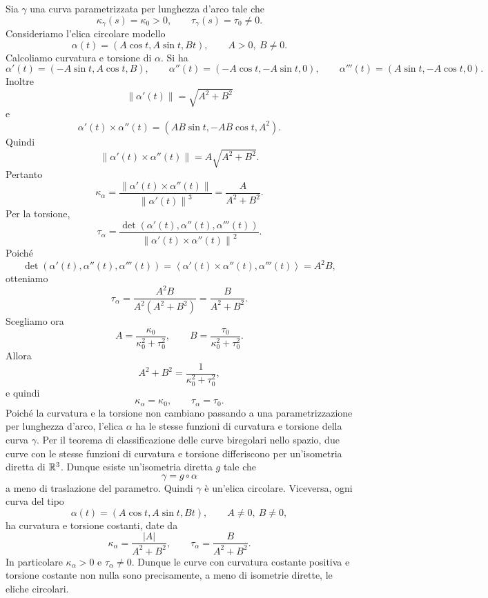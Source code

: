 \documentclass[a4paper]{article}
\begin{document}
\begin{snippetproof}{}
    Sia \(\gamma\) una curva parametrizzata per lunghezza d'arco tale che
    \[
        \kappa_\gamma(s)=\kappa_0>0,
        \qquad
        \tau_\gamma(s)=\tau_0\neq0.
    \]
    Consideriamo l'elica circolare modello
    \[
        \alpha(t)=(A\cos t,A\sin t,Bt),
        \qquad A>0,\ B\neq0.
    \]
    Calcoliamo curvatura e torsione di \(\alpha\). Si ha
    \[
        \alpha'(t)=(-A\sin t,A\cos t,B),
        \qquad
        \alpha''(t)=(-A\cos t,-A\sin t,0),
        \qquad
        \alpha'''(t)=(A\sin t,-A\cos t,0).
    \]
    Inoltre
    \[
        \left\|\alpha'(t)\right\|=\sqrt{A^2+B^2}
    \]
    e
    \[
        \alpha'(t)\times\alpha''(t)
        =
        \left(
            AB\sin t,
            -AB\cos t,
            A^2
        \right).
    \]
    Quindi
    \[
        \left\|\alpha'(t)\times\alpha''(t)\right\|
        =
        A\sqrt{A^2+B^2}.
    \]
    Pertanto
    \[
        \kappa_\alpha
        =
        \frac{\left\|\alpha'(t)\times\alpha''(t)\right\|}{\left\|\alpha'(t)\right\|^3}
        =
        \frac{A}{A^2+B^2}.
    \]
    Per la torsione,
    \[
        \tau_\alpha
        =
        \frac{\det(\alpha'(t),\alpha''(t),\alpha'''(t))}{\left\|\alpha'(t)\times\alpha''(t)\right\|^2}.
    \]
    Poiché
    \[
        \det(\alpha'(t),\alpha''(t),\alpha'''(t))
        =
        \left\langle
            \alpha'(t)\times\alpha''(t),
            \alpha'''(t)
        \right\rangle
        =
        A^2B,
    \]
    otteniamo
    \[
        \tau_\alpha
        =
        \frac{A^2B}{A^2(A^2+B^2)}
        =
        \frac{B}{A^2+B^2}.
    \]
    Scegliamo ora
    \[
        A=\frac{\kappa_0}{\kappa_0^2+\tau_0^2},
        \qquad
        B=\frac{\tau_0}{\kappa_0^2+\tau_0^2}.
    \]
    Allora
    \[
        A^2+B^2=\frac{1}{\kappa_0^2+\tau_0^2},
    \]
    e quindi
    \[
        \kappa_\alpha=\kappa_0,
        \qquad
        \tau_\alpha=\tau_0.
    \]
    Poiché la curvatura e la torsione non cambiano passando a una parametrizzazione per lunghezza d'arco, l'elica \(\alpha\) ha le stesse funzioni di curvatura e torsione della curva \(\gamma\).
    Per il teorema di classificazione delle curve biregolari nello spazio, due curve con le stesse funzioni di curvatura e torsione differiscono per un'isometria diretta di \(\mathbb{R}^3\). Dunque esiste un'isometria diretta \(g\) tale che
    \[
        \gamma=g\circ\alpha
    \]
    a meno di traslazione del parametro. Quindi \(\gamma\) è un'elica circolare.
    Viceversa, ogni curva del tipo
    \[
        \alpha(t)=(A\cos t,A\sin t,Bt),
        \qquad A\neq0,\ B\neq0,
    \]
    ha curvatura e torsione costanti, date da
    \[
        \kappa_\alpha=\frac{|A|}{A^2+B^2},
        \qquad
        \tau_\alpha=\frac{B}{A^2+B^2}.
    \]
    In particolare \(\kappa_\alpha>0\) e \(\tau_\alpha\neq0\). Dunque le curve con curvatura costante positiva e torsione costante non nulla sono precisamente, a meno di isometrie dirette, le eliche circolari.
\end{snippetproof}
\end{document}
